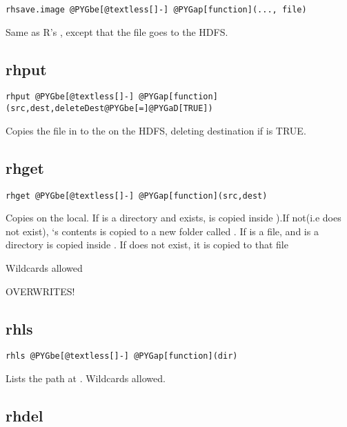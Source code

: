 \documentclass[letterpaper,10pt,english]{manual}
\begin{document}
\begin{Verbatim}[commandchars=@\[\]]
rhsave.image @PYGbe[@textless[]-] @PYGap[function](..., file)
\end{Verbatim}

Same as R's , except that the file goes to the HDFS.


\subsection{rhput}

\begin{Verbatim}[commandchars=@\[\]]
rhput @PYGbe[@textless[]-] @PYGap[function](src,dest,deleteDest@PYGbe[=]@PYGaD[TRUE])
\end{Verbatim}

Copies the file in  to the  on the HDFS, deleting destination if
 is TRUE.


\subsection{rhget}

\begin{Verbatim}[commandchars=@\[\]]
rhget @PYGbe[@textless[]-] @PYGap[function](src,dest)
\end{Verbatim}

Copies  on the local. If  is a directory and  exists,
 is copied inside ).If not(i.e
 does not exist), `s contents is copied to a new folder called
.  If  is a file, and  is a directory  is copied
inside  . If  does not exist, it is copied to that file

Wildcards allowed

OVERWRITES!


\subsection{rhls}

\begin{Verbatim}[commandchars=@\[\]]
rhls @PYGbe[@textless[]-] @PYGap[function](dir)
\end{Verbatim}

Lists the path at . Wildcards allowed.


\subsection{rhdel}
\end{document}
